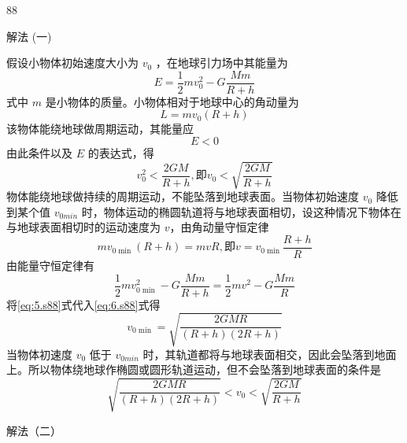 
\begin{solution}{88}
\begin{subsolution}
解法 (一)

假设小物体初始速度大小为 $v_{0}$ ，在地球引力场中其能量为
\begin{equation}
E = \frac {1}{2} m v _ {0} ^ {2} - G \frac {M m}{R + h}
\label{eq:1.s88}
\end{equation}
式中 $m$ 是小物体的质量。小物体相对于地球中心的角动量为
\begin{equation}
L = m v _ {0} (R + h)
\label{eq:2.s88}
\end{equation}
该物体能绕地球做周期运动，其能量应
\begin{equation}
E <   0
\label{eq:3.s88}
\end{equation}
由此条件以及 $E$ 的表达式，得
\begin{equation}
v _ {0} ^ {2} <   \frac {2 G M}{R + h}, \text {即} v _ {0} <   \sqrt {\frac {2 G M}{R + h}}
\label{eq:4.s88}
\end{equation}
物体能绕地球做持续的周期运动，不能坠落到地球表面。当物体初始速度 $v_{0}$ 降低到某个值 $v_{0min}$ 时，物体运动的椭圆轨道将与地球表面相切，设这种情况下物体在与地球表面相切时的运动速度为 $v$，由角动量守恒定律
\begin{equation}
m v _ {0 \min} (R + h) = m v R, \text {即} v = v _ {0 \min} \frac {R + h}{R}
\label{eq:5.s88}
\end{equation}
由能量守恒定律有
\begin{equation}
\frac {1}{2} m v _ {0 \min} ^ {2} - G \frac {M m}{R + h} = \frac {1}{2} m v ^ {2} - G \frac {M m}{R}
\label{eq:6.s88}
\end{equation}
将\eqref{eq:5.s88}式代入\eqref{eq:6.s88}式得
\begin{equation}
v _ {0 \min} = \sqrt {\frac {2 G M R}{(R + h) (2 R + h)}}
\label{eq:7.s88}
\end{equation}
当物体初速度 $v_{0}$ 低于 $v_{0min}$ 时，其轨道都将与地球表面相交，因此会坠落到地面上。所以物体绕地球作椭圆或圆形轨道运动，但不会坠落到地球表面的条件是
\begin{equation}
\sqrt {\frac {2 G M R}{(R + h) (2 R + h)}} <   v _ {0} <   \sqrt {\frac {2 G M}{R + h}}
\label{eq:8.s88}
\end{equation}

解法（二）


\end{subsolution}
\end{solution}
